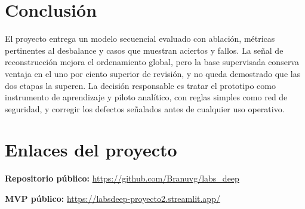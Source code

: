 \documentclass[11pt,a4paper]{article}
\begin{document}
\section{Conclusión}
El proyecto entrega un modelo secuencial evaluado con ablación, métricas pertinentes al desbalance y casos que muestran aciertos y fallos. La señal de reconstrucción mejora el ordenamiento global, pero la base supervisada conserva ventaja en el uno por ciento superior de revisión, y no queda demostrado que las dos etapas la superen. La decisión responsable es tratar el prototipo como instrumento de aprendizaje y piloto analítico, con reglas simples como red de seguridad, y corregir los defectos señalados antes de cualquier uso operativo.

\section*{Enlaces del proyecto}
\textbf{Repositorio público:} \url{https://github.com/Branuvg/labs_deep}

\textbf{MVP público:} \url{https://labsdeep-proyecto2.streamlit.app/}
\end{document}
